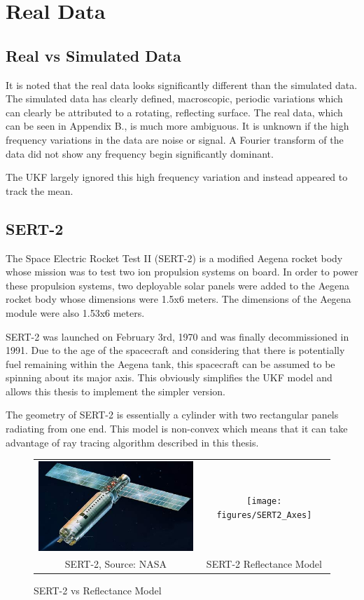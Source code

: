 \section{Real Data}

\subsection{Real vs Simulated Data}

It is noted that the real data looks significantly different than the simulated data. The simulated data has clearly defined, macroscopic, periodic variations which can clearly be attributed to a rotating, reflecting surface. The real data, which can be seen in Appendix B., is much more ambiguous. It is unknown if the high frequency variations in the data are noise or signal. A Fourier transform of the data did not show any frequency begin significantly dominant.

The UKF largely ignored this high frequency variation and instead appeared to track the mean.

\subsection{SERT-2}

The Space Electric Rocket Test II (SERT-2) is a modified Aegena rocket body whose mission was to test two ion propulsion systems on board. \cite{sert2} In order to power these propulsion systems, two deployable solar panels were added to the Aegena rocket body whose dimensions were 1.5x6 meters. The dimensions of the Aegena module were also 1.53x6 meters.

SERT-2 was launched on February 3rd, 1970 and was finally decommissioned in 1991. Due to the age of the spacecraft and considering that there is potentially fuel remaining within the Aegena tank, this spacecraft can be assumed to be spinning about its major axis. This obviously simplifies the UKF model and allows this thesis to implement the simpler version.

The geometry of SERT-2 is essentially a cylinder with two rectangular panels radiating from one end. This model is non-convex which means that it can take advantage of ray tracing algorithm described in this thesis. 

\begin{figure}\label{sert_model}
	\begin{tabular}{cc}
	\includegraphics[width = 80mm]{figures/sert-2} & \texttt{[image: figures/SERT2\_Axes]} \\
	SERT-2, Source: NASA & SERT-2 Reflectance Model 
	
	\end{tabular}
	\caption{SERT-2 vs Reflectance Model}
\end{figure}

